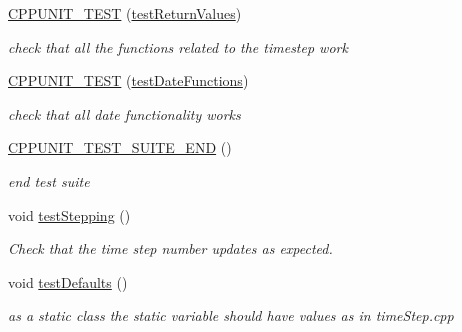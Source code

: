 \begin{DoxyCompactItemize}
\mbox{\label{classtimeStepTest_a83693f088afb5b02ca85ede22866efbf}} 
\mbox{\hyperlink{classtimeStepTest_a83693f088afb5b02ca85ede22866efbf}{C\+P\+P\+U\+N\+I\+T\+\_\+\+T\+E\+ST}} (\mbox{\hyperlink{classtimeStepTest_abb17f1970e1ec459c524ef87870f651f}{test\+Return\+Values}})
\begin{DoxyCompactList}\small\item\em check that all the functions related to the timestep work \end{DoxyCompactList}\item 
\mbox{\label{classtimeStepTest_aac5a656f3c6d28ffce6db8d6e05e3f7d}} 
\mbox{\hyperlink{classtimeStepTest_aac5a656f3c6d28ffce6db8d6e05e3f7d}{C\+P\+P\+U\+N\+I\+T\+\_\+\+T\+E\+ST}} (\mbox{\hyperlink{classtimeStepTest_a35fe812055dc5fa7f53eb898d568256c}{test\+Date\+Functions}})
\begin{DoxyCompactList}\small\item\em check that all date functionality works \end{DoxyCompactList}\item 
\mbox{\label{classtimeStepTest_a9d77630b4ebb30faacc9627d0739c836}} 
\mbox{\hyperlink{classtimeStepTest_a9d77630b4ebb30faacc9627d0739c836}{C\+P\+P\+U\+N\+I\+T\+\_\+\+T\+E\+S\+T\+\_\+\+S\+U\+I\+T\+E\+\_\+\+E\+ND}} ()
\begin{DoxyCompactList}\small\item\em end test suite \end{DoxyCompactList}\item 
void \mbox{\hyperlink{classtimeStepTest_a8853eb9214716d678e9c341470582fec}{test\+Stepping}} ()
\begin{DoxyCompactList}\small\item\em Check that the time step number updates as expected. \end{DoxyCompactList}\item 
\mbox{\label{classtimeStepTest_ae501f2f63633a2b24c4cfc1f9c33f96b}} 
void \mbox{\hyperlink{classtimeStepTest_ae501f2f63633a2b24c4cfc1f9c33f96b}{test\+Defaults}} ()
\begin{DoxyCompactList}\small\item\em as a static class the static variable should have values as in time\+Step.\+cpp \end{DoxyCompactList}\item 

\end{DoxyCompactItemize}
